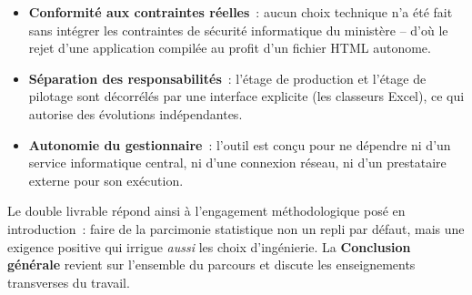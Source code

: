 \begin{itemize}
    \item \textbf{Conformit\'e aux contraintes r\'eelles}~: aucun choix
    technique n'a \'et\'e fait sans int\'egrer les contraintes de
    s\'ecurit\'e informatique du minist\`ere -- d'o\`u le rejet d'une
    application compil\'ee au profit d'un fichier HTML autonome.
    \item \textbf{S\'eparation des responsabilit\'es}~: l'\'etage de
    production et l'\'etage de pilotage sont d\'ecorr\'el\'es par une
    interface explicite (les classeurs Excel), ce qui autorise des
    \'evolutions ind\'ependantes.
    \item \textbf{Autonomie du gestionnaire}~: l'outil est con\c{c}u pour
    ne d\'ependre ni d'un service informatique central, ni d'une
    connexion r\'eseau, ni d'un prestataire externe pour son ex\'ecution.
\end{itemize}

Le double livrable r\'epond ainsi \`a l'engagement m\'ethodologique pos\'e
en introduction~: faire de la parcimonie statistique non un repli par
d\'efaut, mais une exigence positive qui irrigue \emph{aussi} les choix
d'ing\'enierie. La \textbf{Conclusion g\'en\'erale} revient sur l'ensemble
du parcours et discute les enseignements transverses du travail.
